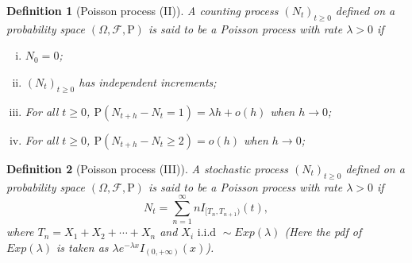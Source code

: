 \documentclass{article}
\newtheorem{definition}{Definition}[section]
\theoremstyle{nonumberplain}
\begin{document}
\begin{definition}[Poisson process (II)]
	A counting process $(N_t)_{t\ge0}$ defined on a probability space $(\Omega,\mathcal{F},\mathrm{P})$ is said to be a \emph{Poisson process} with rate $\lambda>0$ if
	\begin{enumerate}[(i)]
		\item $N_0=0$;
		\item $(N_t)_{t\ge0}$ has independent increments;
		\item \hypertarget{Definition 2.3(iii)}{}For all $t\ge0$, $\mathrm{P}(N_{t+h}-N_t=1)=\lambda h+o(h)$ when $h\to0$;
		\item \hypertarget{Definition 2.3(iv)}{}For all $t\ge0$, $\mathrm{P}(N_{t+h}-N_t\ge2)=o(h)$ when $h\to0$;
	\end{enumerate}	
\end{definition}

\begin{definition}[Poisson process (III)]
	A stochastic process $(N_t)_{t\ge0}$ defined on a probability space $(\Omega,\mathcal{F},\mathrm{P})$ is said to be a \emph{Poisson process} with rate $\lambda>0$ if
	\[
	N_t=\sum_{n=1}^{\infty}nI_{[T_n,T_{n+1})}(t),
	\]
	where $T_n=X_1+X_2+\cdots+X_n$ and $X_i\text{ i.i.d }\sim Exp(\lambda)$ (Here the pdf of $Exp(\lambda)$ is taken as $\lambda e^{-\lambda x}I_{(0,+\infty)}(x)$).
\end{definition}
\end{document}
